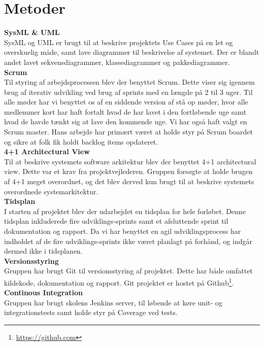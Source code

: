 \section{Metoder} \label{section:metoder}

\textbf{SysML & UML}\\
SysML og UML er brugt til at beskrive projektets Use Cases på en let og overskuelig måde, samt lave diagrammer til beskrivelse af systemet. Der er blandt andet lavet sekvensdiagrammer, klassediagrammer og pakkediagrammer.\\

\textbf{Scrum}\\
Til styring af arbejdsprocessen blev der benyttet Scrum. Dette viser sig igennem brug af iterativ udvikling ved brug af sprints med en længde på 2 til 3 uger. Til alle møder har vi benyttet os af en siddende version af stå op møder, hvor alle medlemmer kort har haft fortalt hvad de har lavet i den fortløbende uge samt hvad de havde tænkt sig at lave den kommende uge. Vi har også haft valgt en Scrum master. Hans arbejde har primært været at holde styr på Scrum boardet og sikre at folk fik holdt backlog items opdateret.\\

\textbf{4+1 Architectural View} \\
Til at beskrive systemets software arkitektur blev der benyttet 4+1 architectural view. Dette var et krav fra projektvejlederen. Gruppen forsøgte at holde brugen af 4+1 meget overordnet, og det blev derved kun brugt til at beskrive systemets overordnede systemarkitektur. \\

\textbf{Tidsplan} \\
I starten af projektet blev der udarbejdet en tidsplan for hele forløbet. Denne tidsplan inkluderede fire udviklings-sprints samt et afsluttende sprint til dokumentation og rapport. Da vi har benyttet en agil udviklingsprocess har indholdet af de fire udviklings-sprints ikke været planlagt på forhånd, og indgår dermed ikke i tidsplanen. \\

\textbf{Versionsstyring} \\
Gruppen har brugt Git til versionsstyring af projektet. Dette har både omfattet kildekode, dokumentation og rapport. Git projektet er hostet på Github\footnote{\url{https://github.com}}.\\

\textbf{Continous Integration} \\
Gruppen har brugt skolens Jenkins server, til løbende at køre unit- og integrationstests samt holde styr på Coverage ved tests. \\
